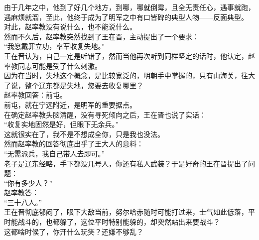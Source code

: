 \begin{multicols}{\theparacolNo}
由于几年之中，他到了好几个地方，到哪，哪就倒霉，且全无责任心，遇事就跑，遇麻烦就溜，至此，他终于成为了明军之中有口皆碑的典型人物——反面典型。\\

对此，赵率教没有说什么，也不能说什么。\\

然而不久后，赵率教突然找到了王在晋，主动提出了一个要求：\\

“我愿戴罪立功，率军收复失地。”\\

王在晋认为，自己一定是听错了，然而当他再次听到同样坚定的话时，他认定，赵率教同志可能是受了什么刺激。\\

因为在当时，失地这个概念，是比较宽泛的，明朝手中掌握的，只有山海关，往大了说，整个辽东都是失地，您要去收复哪里？\\

赵率教回答：前屯。\\

前屯，就在宁远附近，是明军的重要据点。\\

在确定赵率教头脑清醒，没有寻死倾向之后，王在晋也说了实话：\\

“收复实地固然是好，但眼下无余兵。”\\

这就很实在了，我不是不想成全你，只是我也没法。\\

然而赵率教的回答彻底出乎了王大人的意料：\\

“无需派兵，我自己带人去即可。”\\

老子是辽东经略，手下都没几号人，你还有私人武装？于是好奇的王在晋提出了问题：\\

“你有多少人？”\\

赵率教答：\\

“三十八人。”\\

王在晋彻底郁闷了，眼下大敌当前，努尔哈赤随时可能打过来，士气如此低落，平时能战斗的，也都躲了，这位平时特别能躲的，却突然站出来要战斗？\\

这都啥时候了，你开什么玩笑？还嫌不够乱？\\


\end{multicols}
